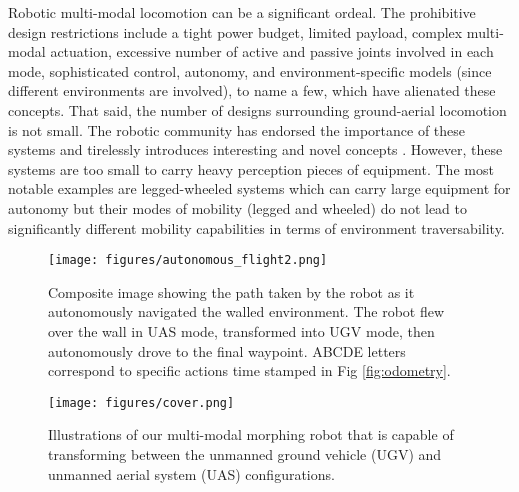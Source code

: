 \documentclass[letterpaper, 10 pt, conference]{ieeeconf}  %
\begin{document}
Robotic multi-modal locomotion can be a significant ordeal. The prohibitive design restrictions include a tight power budget, limited payload, complex multi-modal actuation, excessive number of active and passive joints involved in each mode, sophisticated control, autonomy, and environment-specific models (since different environments are involved), to name a few, which have alienated these concepts. That said, the number of designs surrounding ground-aerial locomotion is not small. The robotic community has endorsed the importance of these systems and tirelessly introduces interesting and novel concepts \cite{araki_multi-robot_2017, Flying_star, peterson2011experimental, tagliabue2020shapeshifter, sihite2021unilateral, liang2021rough, dangol2021hzd, dangol2021control, sihite2021optimization, ramezani2021generative}. %
However, these systems are too small to carry heavy perception pieces of equipment. The most notable examples are legged-wheeled systems \cite{schwarz2016hybrid, suzumura2013real, thomson2012kinematic, grand2004stability, bjelonic2019keep} which can carry large equipment for autonomy but their modes of mobility (legged and wheeled) do not lead to significantly different mobility capabilities in terms of environment traversability. 


\begin{figure}[t]
\vspace{0.08in}
    \centering
    \texttt{[image: figures/autonomous\_flight2.png]}
    \caption{Composite image showing the path taken by the robot as it autonomously navigated the walled environment. The robot flew over the wall in UAS mode, transformed into UGV mode, then autonomously drove to the final waypoint. ABCDE letters correspond to specific actions time stamped in Fig \ref{fig:odometry}.}
    \label{fig:composite}
\vspace{-0.5cm}
\end{figure}

\begin{figure}[t]
\vspace{0.08in}
    \centering
    \texttt{[image: figures/cover.png]}
    \caption{Illustrations of our multi-modal morphing robot that is capable of transforming between the unmanned ground vehicle (UGV) and unmanned aerial system (UAS) configurations.}
    \label{fig:robot_overview}
\vspace{-0.5cm}
\end{figure}
\end{document}
